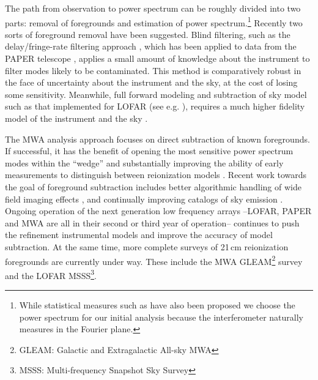 \documentclass[preprint]{aastex}
\begin{document}
The path from observation to power spectrum can be roughly divided into two parts: removal of foregrounds and estimation of power spectrum.\footnote{While statistical measures  such as \citet{Barkana:2008p2154} have also been proposed we choose the power spectrum for our initial analysis because the interferometer naturally measures in the Fourier plane.}  Recently two sorts of foreground removal have been suggested. Blind filtering, such as the delay/fringe-rate filtering approach \cite{Parsons:2012p8896,Liu:2014p10462,Liu:2014p10463},  which has been applied to data from the PAPER telescope \cite{Parsons:2014p10499}, applies a small amount of knowledge about the instrument to filter modes likely to be contaminated.  This method is comparatively robust in the face of uncertainty about the instrument and the sky, at the cost of losing some sensitivity. Meanwhile,  full forward modeling and subtraction of sky model such as that implemented for LOFAR (see e.g. \cite{Jelic:2008p2130,Yatawatta:2013p9699}), requires a much higher fidelity model of the instrument and the sky \citep{Datta:2010p8781,Vedantham:2012p10297}.  

The MWA analysis approach focuses on direct subtraction of known foregrounds.  If successful, it has the benefit of opening the most sensitive power spectrum modes within the ``wedge'' and substantially improving the ability of early measurements to distinguish between reionization models \cite{Beardsley:2013p9952,Pober:2014p10390}. Recent work towards the goal of foreground subtraction includes better algorithmic handling of wide field imaging effects \cite{Tasse:2012p9459,Bhatnagar..2013ApJ,Sullivan:2012p9457,Ord:2010p8442}, and continually improving catalogs of sky emission \citep{deOliveiraCosta:2008p2242,Jacobs:2011p8438}. Ongoing operation of the next generation low frequency arrays --LOFAR, PAPER and MWA are all in their second or third year of operation-- continues to push the refinement instrumental models and improve the accuracy of model subtraction.  At the same time, more complete surveys of 21\,cm reionization foregrounds are currently under way. These include the MWA GLEAM\footnote{GLEAM: Galactic and Extragalactic All-sky MWA} survey  and the LOFAR MSSS\footnote{MSSS: Multi-frequency Snapshot Sky Survey}.   %
\end{document}
